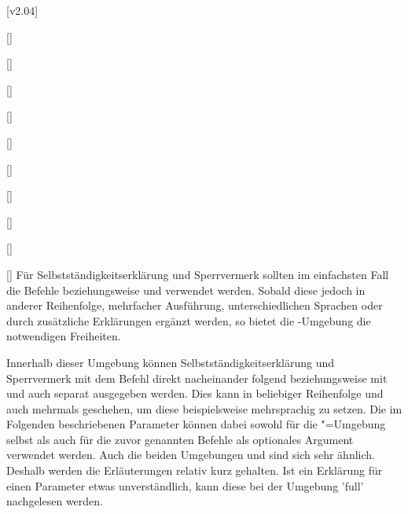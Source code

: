 [v2.04]
\begin{Declaration}[v2.02]{[\LParameter]}
\begin{Declaration}{[]}
\begin{Declaration}[v2.02]{%
  []%
}
\begin{Declaration}[v2.02]{%
  []%
}
\begin{Declaration}[v2.02]{%
  []%
}
\begin{Declaration}{[\PSet]}
\begin{Declaration}{%
  []
}
\begin{Declaration}{[]}
\begin{Declaration}{[]}
\begin{Declaration}{[]}
\printdeclarationlist%
%
%
Für Selbstständigkeitserklärung und Sperrvermerk sollten im einfachsten Fall 
die Befehle  beziehungsweise  und 
 verwendet werden. Sobald diese jedoch in anderer Reihenfolge,  
mehrfacher Ausführung, unterschiedlichen Sprachen oder durch zusätzliche  
Erklärungen ergänzt werden, so bietet die -Umgebung 
die notwendigen Freiheiten.

Innerhalb dieser Umgebung können Selbstständigkeitserklärung und Sperrvermerk 
mit dem Befehl  direkt nacheinander folgend beziehungsweise 
mit  und  auch separat ausgegeben werden. 
Dies kann in beliebiger Reihenfolge und auch mehrmals geschehen, um diese 
beispielsweise mehrsprachig zu setzen. Die im Folgenden beschriebenen Parameter 
können dabei sowohl für die "=Umgebung selbst als 
auch für die zuvor genannten Befehle als optionales Argument verwendet werden.
Auch die beiden Umgebungen  und  
sind sich sehr ähnlich. Deshalb werden die Erläuterungen relativ kurz gehalten. 
Ist ein Erklärung für einen Parameter etwas unverständlich, kann diese bei der 
Umgebung 'full' nachgelesen werden.


\end{Declaration}
\end{Declaration}
\end{Declaration}
\end{Declaration}
\end{Declaration}
\end{Declaration}
\end{Declaration}
\end{Declaration}
\end{Declaration}
\end{Declaration}
